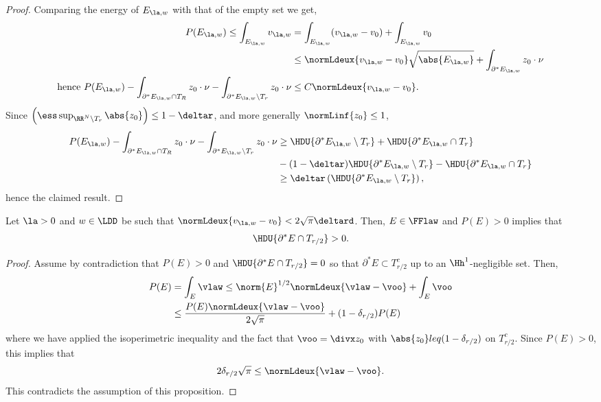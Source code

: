 \begin{proof}
Comparing the energy of $E_{\la,w}$ with that of the empty set we get,
\begin{align*}
  P(E_{\la,w})\leq \int_{E_{\la,w}}v_{\la,w} &= \int_{E_{\la,w}}(v_{\la,w}-v_0) + \int_{E_{\la,w}}v_0
  \\
                                 &\leq \normLdeux{v_{\la,w}-v_0}\sqrt{\abs{E_{\la,w}}} + \int_{\partial^* E_{\la,w}} z_0\cdot \nu
                                 \\
  \mbox{hence }  P(E_{\la,w})- \int_{\partial^* E_{\la,w}\cap T_R}z_0\cdot \nu - \int_{\partial^* E_{\la,w}\setminus T_r}z_0\cdot \nu &\leq C \normLdeux{v_{\la,w}-v_0}.
\end{align*}
Since $\left(\ess \sup_{\RR^N\setminus T_r}\abs{z_0}\right)\leq 1-\deltar$, and more generally $\normLinf{z_0}\leq 1$, 
\begin{align*}
  P(E_{\la,w})- \int_{\partial^* E_{\la,w}\cap T_R}z_0\cdot \nu - \int_{\partial^* E_{\la,w}\setminus T_r}z_0\cdot \nu  &\geq \HDU{\partial^*E_{\la,w}\setminus T_r}+\HDU{\partial^*E_{\la,w}\cap T_r}\\
                                                                                                            &- (1-\deltar)\HDU{\partial^*E_{\la,w}\setminus T_r} - \HDU{\partial^*E_{\la,w}\cap T_r}\\
                                                                                                            &\geq  \deltar \left(\HDU{\partial^*E_{\la,w}\setminus T_r}\right),
\end{align*}
hence the claimed result.

\end{proof}



\begin{prop}\label{prop:entiretubecomplement}
Let $\la>0$ and $w\in \LDD$ be such that $\normLdeux{v_{\la,w}-v_0} <2\sqrt{\pi}\deltard$. Then, $E\in \FFlaw$ and $P(E)>0$ implies that
  \begin{equation}
    \HDU{\partial^* E \cap T_{r/2}}>0.
  \end{equation}
\end{prop}
\begin{proof}
Assume by contradiction that $P(E)>0$ and $\HDU{\partial^* E\cap T_{r/2}}=0$ so that $\partial^* E \subset T_{r/2}^c$ up to an $\Hh^1$-negligible set. Then,
\begin{align*}
P(E) &= \int_E \vlaw \leq \norm{E}^{1/2} \normLdeux{\vlaw - \voo} + \int_E \voo\\
&\leq \frac{P(E) \normLdeux{\vlaw - \voo} }{2\sqrt{\pi}}+ (1-\delta_{r/2}) P(E)
\end{align*}
where we have applied the isoperimetric inequality and the fact that $\voo = \divx z_0$ with $\abs{z_0}leq (1-\delta_{r/2})$ on $T_{r/2}^c$. Since $P(E)>0$, this implies that
$$
2\delta_{r/2}\sqrt{\pi} \leq \normLdeux{\vlaw - \voo}.$$
This contradicts the assumption of this proposition.
\end{proof}



